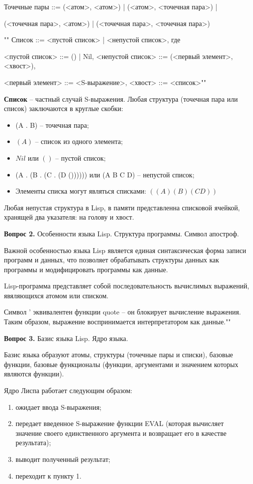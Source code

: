 \documentclass[12pt]{report}
\begin{document}
	\newline
	
	Точечные пары ::= (<атом>, <атом>) | (<атом>, <точечная пара>) |
	
	(<точечная пара>, <атом>) | (<точечная пара>, <точечная пара>)
	
	""\newline
	\indent Список ::= <пустой список> | <непустой список>, где
	
	<пустой список> ::= () | Nil, <непустой список> ::= (<первый элемент>, <хвост>),
	
	<первый элемент> ::= <S-выражение>, <хвост> ::= <список>""\newline
	
	\indent \textbf{Список} -- частный случай S-выражения. Любая структура (точечная пара или список) заключаются в круглые скобки:
	
\begin{itemize}
	\item (A . B) -- точечная пара;
	\item $(A)$ -- список из одного элемента;
	\item $Nil$ или $()$ -- пустой список;
	\item (A . (B . (C . (D ()))))) или (A B C D) -- непустой список;
	\item Элементы списка могут являться списками: $((A)(B)(CD))$
\end{itemize}
	
Любая непустая структура в Lisp, в памяти представленна списковой ячейкой, хранящей два указателя: на голову и хвост.

	
\textbf{Вопрос 2.} Особенности языка Lisp. Структура программы. Символ апостроф.

Важной особенностью языка Lisp является единая синтаксическая форма записи программ и данных, что позволяет обрабатывать структуры данных как программы и модифицировать программы как данные. 

Lisp-программа представляет собой последовательность вычислимых выражений, явяляющихся атомом или списком.

Символ ' эквивалентен функции quote – он блокирует вычисление выражения. Таким образом, выражение воспринимается интерпретатором как данные.""\newline

\textbf{Вопрос 3.} Базис языка Lisp. Ядро языка. \newline

Базис языка образуют атомы, структуры (точечные пары и списки), базовые функции, базовые функционалы (функции, аргументами и значением которых являются функции).

Ядро Лиспа работает следующим образом: 
\begin{enumerate}
\item ожидает ввода S-выражения; 
\item передает введенное S-выражение функции EVAL (которая вычисляет значение своего единственного аргумента и возвращает его в качестве результата); 
\item выводит полученный результат;
\item переходит к пункту 1.
\end{enumerate}
	
\end{document}
